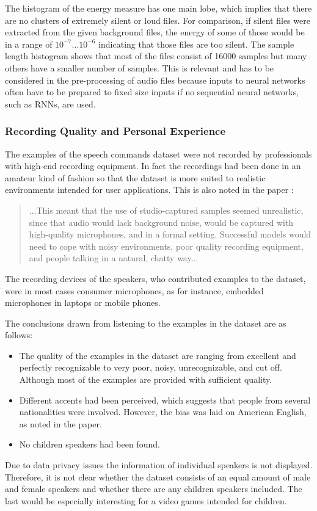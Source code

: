 \FloatBarrier
\noindent
The histogram of the energy measure has one main lobe, which implies that there are no clusters of extremely silent or loud files.
For comparison, if silent files were extracted from the given background files, the energy of some of those would be in a range of $10^{-7} \dots 10^{-6}$ indicating that those files are too silent.
The sample length histogram shows that most of the files consist of 16000 samples but many others have a smaller number of samples. 
This is relevant and has to be considered in the pre-processing of audio files because inputs to neural networks often have to be prepared to fixed size inputs if no sequential neural networks, such as RNNs, are used.



\subsubsection{Recording Quality and Personal Experience}
The examples of the speech commands dataset \cite{Warden2018} were not recorded by professionals with high-end recording equipment.
In fact the recordings had been done in an amateur kind of fashion so that the dataset is more suited to realistic environments intended for user applications.
This is also noted in the paper \cite{Warden2018}:
\begin{quote}
...This meant that the use of studio-captured samples seemed unrealistic, since that audio would lack background noise, would be captured with high-quality microphones, and in a formal setting. 
Successful models would need to cope with noisy environments, poor quality recording equipment, and people talking in a natural, chatty way...
\end{quote}
The recording devices of the speakers, who contributed examples to the dataset, were in most cases consumer microphones, as for instance, embedded microphones in laptops or mobile phones.

The conclusions drawn from listening to the examples in the dataset are as follows:
\begin{itemize}
  \item The quality of the examples in the dataset are ranging from excellent and perfectly recognizable to very poor, noisy, unrecognizable, and cut off. Although most of the examples are provided with sufficient quality.
  \item Different accents had been perceived, which suggests that people from several nationalities were involved.
  However, the bias was laid on American English, as noted in the paper.
  \item No children speakers had been found.
\end{itemize}
Due to data privacy issues the information of individual speakers is not displayed.
Therefore, it is not clear whether the dataset consists of an equal amount of male and female speakers and whether there are any children speakers included.
The last would be especially interesting for a video games intended for children.

